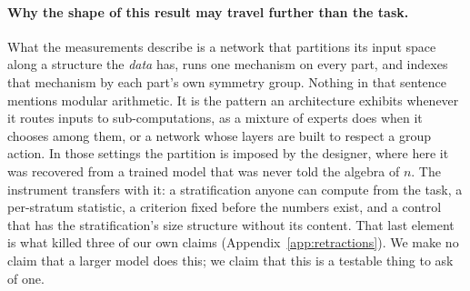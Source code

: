 \paragraph{Why the shape of this result may travel further than the task.} What the
measurements describe is a network that partitions its input space along a structure the
\emph{data} has, runs one mechanism on every part, and indexes that mechanism by each
part's own symmetry group. Nothing in that sentence mentions modular arithmetic. It is the
pattern an architecture exhibits whenever it routes inputs to sub-computations, as a mixture
of experts does when it chooses among them, or a network whose layers are built to respect a
group action. In those settings the partition is imposed by the designer, where here it was
recovered from a trained model that was never told the algebra of $n$. The instrument transfers with
it: a stratification anyone can compute from the task, a per-stratum statistic, a criterion
fixed before the numbers exist, and a control that has the stratification's size structure
without its content. That last element is what killed three of our own claims
(Appendix~\ref{app:retractions}). We make no claim that a larger model does this; we claim
that this is a testable thing to ask of one.

